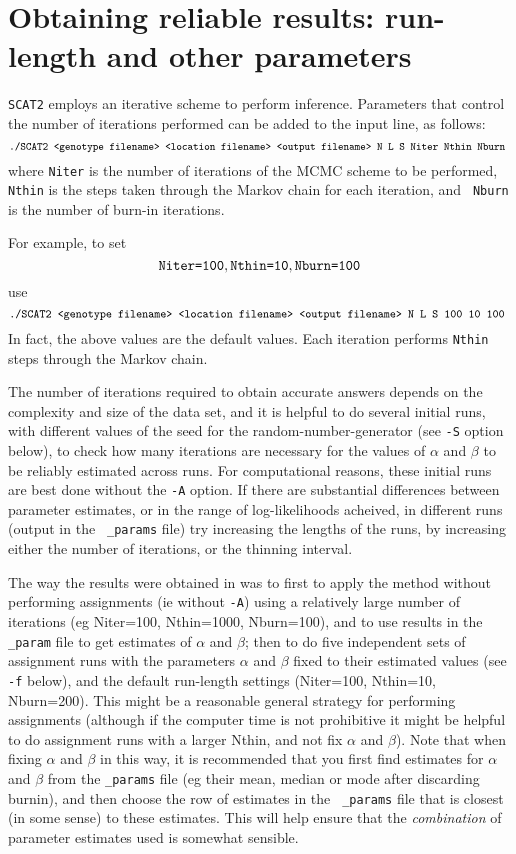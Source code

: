 \documentclass[11pt,titlepage,times,letterpaper]{article}
\def\SCAT{{\tt SCAT2} }
\begin{document}

\section{Obtaining reliable results: run-length and other parameters}
\label{HowLong}

\SCAT employs an iterative scheme to perform inference. 
Parameters that control the number of iterations performed
can be added to the input line, as follows:
$$\text{{\small \tt ./SCAT2 <genotype filename> <location filename> <output
filename> N L S Niter Nthin Nburn }}$$ where {\tt Niter} is the number
of iterations of the MCMC scheme to be performed, {\tt Nthin} is the
steps taken through the Markov chain for each iteration, and {\tt
Nburn} is the number of burn-in iterations.

For example, to set
$$\text{{\tt Niter=100}}, \text{{\tt Nthin=10}}, \text{{\tt Nburn=100}}$$
use
$$\text{{\tt \small./SCAT2 <genotype filename> <location filename> <output
filename> N L S 100 10 100 }}$$ 
In fact, the above values are the
default values. Each iteration performs {\tt Nthin}
steps through the Markov chain.

The number of iterations required to obtain accurate answers depends
on the complexity and size of the data set, and it is helpful to do
several initial runs, with different values of the seed for the
random-number-generator (see {\tt -S} option below), to check how many
iterations are necessary for the values of $\alpha$ and $\beta$ to be
reliably estimated across runs. For computational reasons, these
initial runs are best done without the {\tt -A} option.  If there are
substantial differences between parameter estimates, or in the range
of log-likelihoods acheived, in different runs (output in the {\tt
\_params} file) try increasing the lengths of the runs, by increasing
either the number of iterations, or the thinning interval.

The way the results were obtained in \cite{wasser.etal.04} was to
first to apply the method without performing assignments (ie without
{\tt -A}) using a relatively large number of iterations (eg
{Niter=100, Nthin=1000, Nburn=100}), and to use results in the {\tt
\_param} file to get estimates of $\alpha$ and $\beta$; then to do
five independent sets of assignment runs with the parameters $\alpha$
and $\beta$ fixed to their estimated values (see {\tt -f} below), and
the default run-length settings (Niter=100, Nthin=10, Nburn=200). This
might be a reasonable general strategy for performing assignments
(although if the computer time is not prohibitive it might be helpful
to do assignment runs with a larger Nthin, and not fix $\alpha$ and
$\beta$). Note that when fixing $\alpha$ and $\beta$ in this way, it
is recommended that you first find estimates for $\alpha$ and $\beta$
from the {\tt \_params} file (eg their mean, median or mode after
discarding burnin), and then choose the row of estimates in the {\tt
\_params} file that is closest (in some sense) to these
estimates. This will help ensure that the {\it combination} of
parameter estimates used is somewhat sensible.
\end{document}
